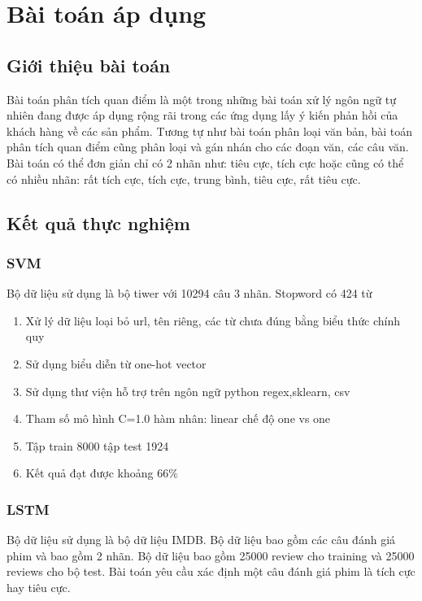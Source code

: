 \documentclass[a4paper,12pt]{report}
\begin{document}
\chapter{Bài toán áp dụng}
\section{Giới thiệu bài toán}
Bài toán phân tích quan điểm là một trong những bài toán xử lý ngôn ngữ tự nhiên đang được áp dụng rộng rãi trong các ứng dụng lấy ý kiến phản hồi của khách hàng về các sản phẩm. Tương tự như bài toán phân loại văn bản, bài toán phân tích quan điểm cũng phân loại và gán nhán cho các đoạn văn, các câu văn. Bài toán có thể đơn giản chỉ có 2 nhãn như: tiêu cực, tích cực hoặc cũng có thể có nhiều nhãn: rất tích cực, tích cực, trung bình, tiêu cực, rất tiêu cực. 


\section{Kết quả thực nghiệm}


\subsection{SVM}
Bộ dữ liệu sử dụng là bộ tiwer với 10294 câu 3 nhãn.
Stopword có  424 từ
\begin{enumerate}
\item Xử lý dữ liệu loại bỏ url, tên riêng, các từ chưa đúng bằng biểu thức chính quy
\item Sử dụng biểu diễn từ one-hot vector
\item Sử dụng thư viện hỗ trợ trên ngôn ngữ python regex,sklearn, csv
\item Tham số mô hình C=1.0 hàm nhân: linear chế độ one vs one 
\item Tập train 8000 tập test 1924
\item Kết quả đạt được khoảng 66$\%$
\end{enumerate}


\subsection{LSTM}
Bộ dữ liệu sử dụng là bộ dữ liệu IMDB. Bộ dữ liệu bao gồm các câu đánh giá phim và bao gồm 2 nhãn. Bộ dữ liệu bao gồm 25000 review cho training và 25000 reviews cho bộ test. Bài toán yêu cầu xác định một câu đánh giá phim là tích cực hay tiêu cực.
\end{document}
